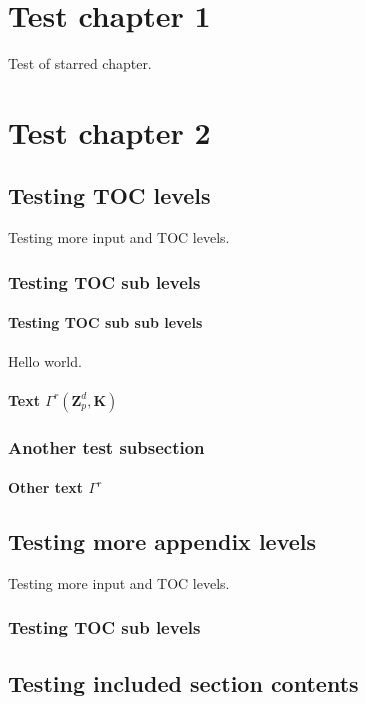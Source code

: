\chapter*{Test chapter 1}
Test of starred chapter.

\chapter{Test chapter 2}

\section{Testing TOC levels}
Testing more input and TOC levels.

\subsection{Testing TOC sub levels}

\subsubsection{Testing TOC sub sub levels}
Hello world.

\subsubsection{Text $\Gamma^{r}(\ensuremath{{\mathbf{Z}}}_p^d,\mathbf{K})$}

\subsection{Another test subsection}

\subsubsection{Other text $\Gamma^{r}$}

\section{Testing more appendix levels}
Testing more input and TOC levels.

\subsection{Testing TOC sub levels}

\section{Testing included section contents}


